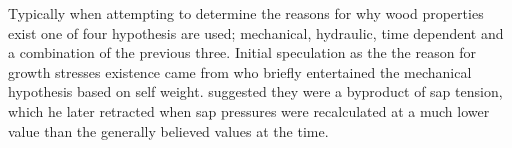 Typically when attempting to determine the reasons for why wood properties exist
one of four hypothesis are used; mechanical, hydraulic, time dependent and a
combination of the previous three. Initial speculation as the the reason for
growth stresses existence came from \cite{MARTLEY01011928} who briefly entertained the
mechanical hypothesis based on self weight. \cite{jacobs1945l} suggested they were a
byproduct of sap tension, which he later retracted when sap
pressures were recalculated at a much lower value than the generally believed
values at the time. 